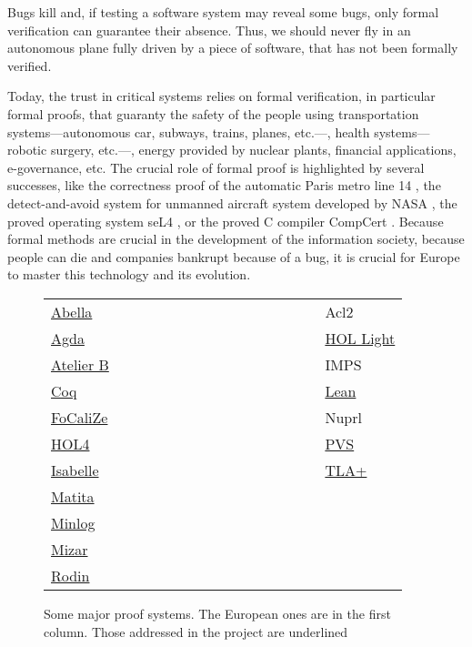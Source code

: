 Bugs kill and, if testing a software system may reveal some bugs, only
formal verification can guarantee their absence.  Thus, we should
never fly in an autonomous plane fully driven by a piece of software,
that has not been formally verified.

Today, the trust in critical systems relies on formal verification, in
particular formal proofs, that guaranty the safety of the people using
transportation systems---autonomous car, subways, trains, planes,
etc.---, health systems---robotic surgery, etc.---, energy provided by
nuclear plants, financial applications, e-governance, etc. The crucial
role of formal proof is highlighted by several successes, like the
correctness proof of the automatic Paris metro line 14 \cite{metro14},
the detect-and-avoid system for unmanned aircraft system developed
by NASA \cite{Munoz16}, the proved operating system seL4 \cite{Klein09},
or the proved C compiler CompCert \cite{Leroy06}. Because formal methods are crucial in the
development of the information society, because people can die and
companies bankrupt because of a bug, it is crucial for Europe to
master this technology and its evolution.

\thispagestyle{empty}

\begin{figure}
\begin{tabular}{ll}
  {\sc \underline{Abella}}~~~~~~~~~~~~~~~~~~~~~~~~~~~~~~&{\sc Acl2}\\
{\sc \underline{Agda}} &  {\sc \underline{HOL Light}}\\
{\sc \underline{Atelier B}} &  {\sc IMPS}\\
{\sc \underline{Coq}}  &  {\sc \underline{Lean}}\\
{\sc \underline{FoCaliZe}}  &  {\sc Nuprl}\\
{\sc \underline{HOL4}}  &  {\sc \underline{PVS}}\\
{\sc \underline{Isabelle}}  &  {\sc \underline{TLA+}}\\
{\sc \underline{Matita}}\\
{\sc \underline{Minlog}}\\
{\sc \underline{Mizar}}\\
{\sc \underline{Rodin}}\\
\end{tabular}
\caption{Some major proof systems. The European ones are in the first column.
  Those addressed in the project are underlined\label{systems}}
\end{figure}

